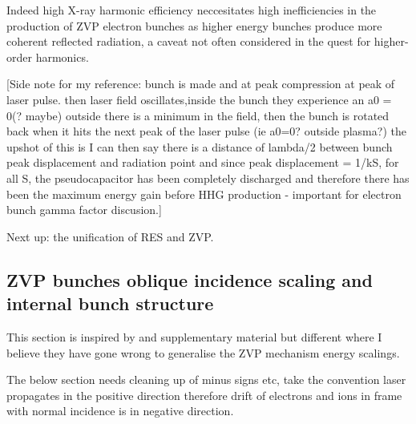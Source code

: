 Indeed high X-ray harmonic efficiency neccesitates high inefficiencies in the production of ZVP electron bunches as higher energy bunches produce more coherent reflected radiation, a caveat not often considered in the quest for higher-order harmonics.


[Side note for my reference: bunch is made and at peak compression at peak of laser pulse. then laser field oscillates,inside the bunch they experience an a0 = 0(? maybe) outside there is a minimum in the field, then the bunch is rotated back when it hits the next peak of the laser pulse (ie a0=0? outside plasma?) the upshot of this is I can then say there is a distance of lambda/2 between bunch peak displacement and radiation point and since peak displacement = 1/kS, for all S, the pseudocapacitor has been completely discharged and therefore there has been the maximum energy gain before HHG production - important for electron bunch gamma factor discusion.]


Next up: the unification of RES and ZVP.

\subsection{ZVP bunches oblique incidence scaling and internal bunch structure}
This section is inspired by \cite{gonoskov_2011_UltrarelativisticNanoplasmonicsRoute} and \cite{vincenti_2014_OpticalPropertiesRelativistic} supplementary material but different where I believe they have gone wrong to generalise the \ac{ZVP} mechanism energy scalings.

The below section needs cleaning up of minus signs etc, take the convention laser propagates in the positive direction therefore drift of electrons and ions in frame with normal incidence is in negative direction.

